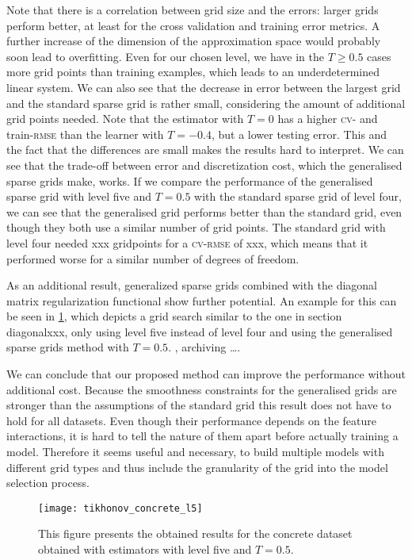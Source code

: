 Note that there is a correlation between grid size and the errors: larger grids
perform better, at least for the cross validation and training error metrics.
A further increase of the dimension of the approximation space would probably
soon lead to overfitting.
Even for our chosen level, we have in the \(T \geq 0.5\) cases more grid points
than training examples, which leads to an underdetermined linear system.
We can also see that the decrease in error between the largest grid and the standard sparse grid is rather small, considering the amount of additional grid points needed.
Note that the estimator with \(T = 0\) has a higher \textsc{cv}- and
train-\textsc{rmse} than the learner with \(T = -0.4\), but a lower testing
error.
This and the fact that the differences are small makes the results hard to
interpret.
We can see that the trade-off between error and discretization cost, which the generalised sparse grids make, works.
If we compare the performance of the generalised sparse grid with level five and
\(T = 0.5\) with the standard sparse grid of level four, we can see that the
generalised grid performs better than the standard grid, even though they both
use a similar number of grid points.
The standard grid with level four needed xxx gridpoints for a \textsc{cv-rmse}
of xxx, which means that it performed worse for a similar number of degrees of freedom.

As an additional result, generalized sparse grids combined with the diagonal
matrix regularization functional show further potential.
An example for this can be seen in \cref{fig:tikhonov-concrete-l5}, which depicts a grid search
similar to the one in section diagonalxxx, only using level five instead of
level four and using the generalised sparse grids method with \(T = 0.5\).
, archiving \ldots.

We can conclude that our proposed method can improve the performance without
additional cost.
Because the smoothness constraints for the generalised grids are stronger than
the assumptions of the standard grid this result does not have to hold for all datasets.
Even though their performance depends on the feature interactions, it is hard to
tell the nature of them apart before actually training a model.
Therefore it seems useful and necessary, to build multiple models with different
grid types and thus include the granularity of the grid into the model selection process.

\begin{figure}[htb]
  \centering
  \texttt{[image: tikhonov\_concrete\_l5]}
  \caption{This figure presents the obtained results for the concrete dataset
    obtained with estimators with level five and \(T = 0.5\).}
  \label{fig:tikhonov-concrete-l5}
\end{figure}

